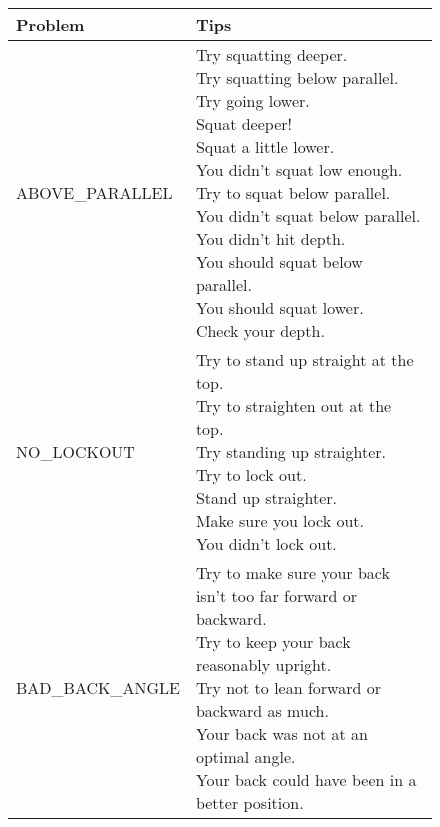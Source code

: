 \begin{figure}[H]
    \centering
	\begin{tabular}{ | l | p{10cm} | }
		\hline
	    \textbf{Problem} & \textbf{Tips}\\ \hline
	    ABOVE\_PARALLEL & \parbox{10cm}{
			Try squatting deeper. \\
			Try squatting below parallel. \\
			Try going lower. \\
			Squat deeper! \\
			Squat a little lower. \\
			You didn't squat low enough. \\
			Try to squat below parallel. \\
			You didn't squat below parallel. \\
			You didn't hit depth. \\
			You should squat below parallel. \\
			You should squat lower. \\
			Check your depth. \\} \\
		\hline

		NO\_LOCKOUT & \parbox{10cm}{
			Try to stand up straight at the top. \\
			Try to straighten out at the top. \\
			Try standing up straighter. \\
			Try to lock out. \\
			Stand up straighter. \\
			Make sure you lock out. \\
			You didn't lock out. \\} \\
		\hline

		BAD\_BACK\_ANGLE & \parbox{10cm}{
			Try to make sure your back isn't too far forward or backward. \\
			Try to keep your back reasonably upright. \\
			Try not to lean forward or backward as much. \\
			Your back was not at an optimal angle. \\
			Your back could have been in a better position. \\} \\
		\hline


\end{tabular}
\end{figure}
